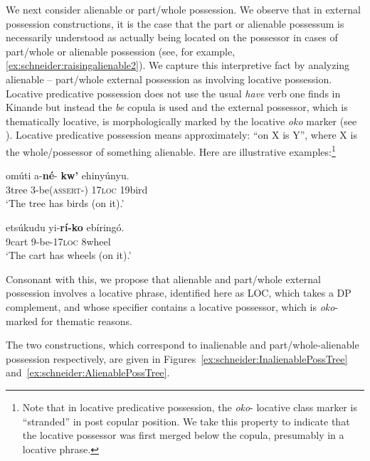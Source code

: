 \documentclass[output=paper]{langscibook}
\begin{document}
We next consider alienable or part/whole possession. We observe that in external possession constructions, it is the case that the part or alienable possessum is necessarily understood as actually being located on the possessor in cases of part/whole or alienable possession (see, for example, \ref{ex:schneider:raisingalienable2}). We capture this interpretive fact by analyzing alienable – part/whole external possession as involving locative possession. Locative predicative possession does not use the usual \textit{have} verb one finds in Kinande but instead the \textit{be} copula is used and the external possessor, which is thematically locative, is morphologically marked by the locative \textit{oko} marker (see \citeauthor{SchneiderZiogaMutaka2019a} \citeyear{SchneiderZiogaMutaka2019a}). Locative predicative possession means approximately: “on X is Y”, where X is the whole/possessor of something alienable. Here are illustrative examples:\footnote{Note that in locative predicative possession, the \textit{oko}- locative class marker is ``stranded'' in post copular position. We take this property to indicate that the locative possessor was first merged below the copula, presumably in a locative phrase. }  

\ea \label{ex:schneider:Alienable}
\begin{xlist}

\ex \label{ex:schneider:Alienable1}
\gll omúti a-\textbf{n\'e}- \textbf{kw'} ehinyúnyu.  \\
3tree 3-be(\textsc{assert-}) \textsc{17loc} 19bird\\
\glt `The tree has birds (on it).' 

\ex \label{ex:schneider:Alienable2}
\gll etsúkudu  yi-\textbf{rí-ko} ebíring\'o.\\
9cart 9-be-\textsc{17loc} 8wheel \\
\glt `The cart has wheels (on it).' 

\end{xlist}
\z

Consonant with this, we propose that alienable and part/whole external possession involves a locative phrase, identified here as LOC, which takes a DP complement, and whose specifier contains a locative possessor, which is \textit{oko}- marked for thematic reasons. 

The two constructions, which correspond to inalienable and part\slash whole-alien\-able possession respectively, are given in Figures~\ref{ex:schneider:InalienablePossTree} and~\ref{ex:schneider:AlienablePossTree}.\largerpage
\end{document}
